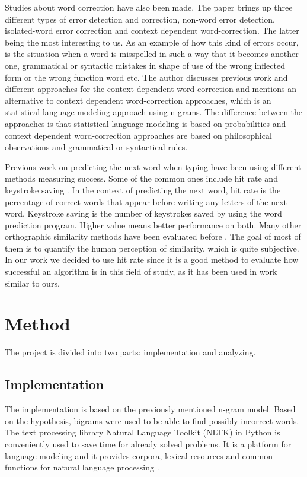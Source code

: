 \documentclass[a4paper,12pt]{article}
\begin{document}
Studies about word correction have also been made. The paper \cite{Kukich1992Tecniques} brings up three different types of error detection and correction, non-word error detection, isolated-word error correction and context dependent word-correction. The latter being the most interesting to us. As an example of how this kind of errors occur, is the situation when a word is misspelled in such a way that it becomes another one, grammatical or syntactic mistakes in shape of use of the wrong inflected form or the wrong function word etc. The author discusses previous work and different approaches for the context dependent word-correction and mentions an alternative to context dependent word-correction approaches, which is an statistical language modeling approach using n-grams. The difference between the approaches is that statistical language modeling is based on probabilities and context dependent word-correction approaches are based on philosophical observations and grammatical or syntactical rules.

Previous work on predicting the next word when typing have been using different methods measuring success. Some of the common ones include hit rate and keystroke saving \cite{ghayoomi2005word}. In the context of predicting the next word, hit rate is the percentage of correct words that appear before writing any letters of the next word. Keystroke saving is the number of keystrokes saved by using the word prediction program.  Higher value means better performance on both. Many other orthographic similarity methods have been evaluated before \cite{frunza2006automatic}. The goal of most of them is to quantify the human perception of similarity, which is quite subjective. In our work we decided to use hit rate since it is a good method to evaluate how successful an algorithm is in this field of study, as it has been used in work similar to ours. 

\section{Method}
\label{sec:method}
The project is divided into two parts: implementation and analyzing.

\subsection{Implementation}
\label{ref:implementation}
The implementation is based on the previously mentioned n-gram model. Based on the hypothesis, bigrams were used to be able to find possibly incorrect words. The text processing library Natural Language Toolkit (NLTK) in Python is conveniently used to save time for already solved problems. It is a platform for language modeling and it provides corpora, lexical resources and common functions for natural language processing \cite{loper2002nltk}. 
\end{document}
